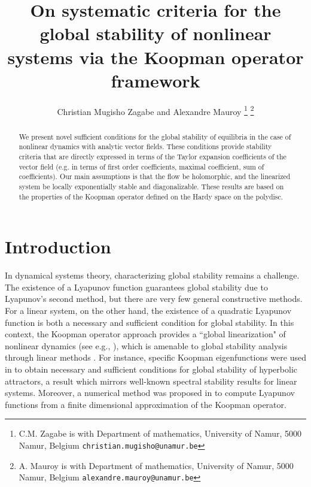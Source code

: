 \documentclass{article}
\title{\Large \bf
On systematic criteria for the global stability of nonlinear systems via the Koopman operator framework
}
\author{Christian Mugisho Zagabe and Alexandre Mauroy%
\thanks{C.M. Zagabe is with Department of mathematics,
        University of Namur, 5000 Namur, Belgium
        {\tt\small christian.mugisho@unamur.be}}%
\thanks{A. Mauroy is with Department of mathematics,
        University of Namur, 5000 Namur, Belgium
        {\tt\small alexandre.mauroy@unamur.be}}%
}
\date{}
\begin{document}
\maketitle



\begin{abstract}
We present novel sufficient conditions for the global stability of equilibria in the case of nonlinear dynamics with analytic vector fields. These conditions provide stability criteria that are directly expressed in terms of the Taylor expansion coefficients of the vector field (e.g. in terms of first order coefficients, maximal coefficient, sum of coefficients). Our main assumptions is that the flow be holomorphic, and the linearized system be locally exponentially stable and diagonalizable. These results are based on the properties of the Koopman operator defined on the Hardy space on the polydisc.




\end{abstract}


\section{Introduction}



In dynamical systems theory, characterizing global stability remains a challenge. The existence of a Lyapunov function guarantees global stability due to Lyapunov's second method, but there are very few general constructive methods. For a linear system, on the other hand, the existence of a quadratic Lyapunov function is both a necessary and sufficient condition for global stability. 
In this context, the Koopman operator approach provides a ``global linearization" of nonlinear dynamics (see e.g., \cite{MBRMIM, AMIMYS}), which is amenable to global stability analysis through linear methods \cite{AMIMYS}. 
For instance, specific Koopman eigenfunctions were used in \cite{AMIM1} to obtain necessary and sufficient conditions for global stability of hyperbolic attractors, a result which mirrors well-known spectral stability results for linear systems. Moreover, a numerical method was proposed in \cite{MauroySootlaMezic_stability} to compute Lyapunov functions  from a finite dimensional approximation of the Koopman operator. 
\end{document}
